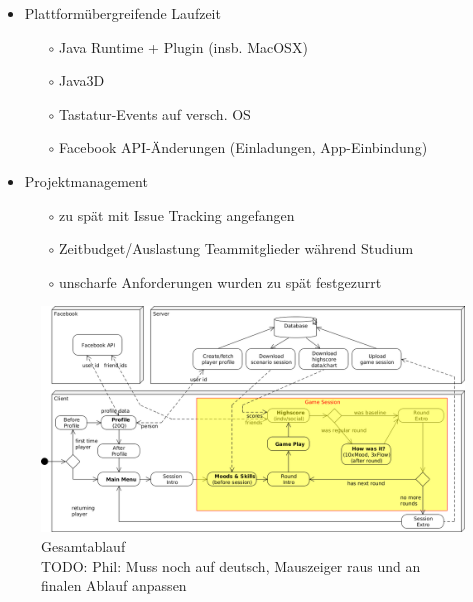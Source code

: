 \documentclass[a4paper,12pt]{scrartcl}
\begin{document}
\begin{itemize}
  \item Plattformübergreifende Laufzeit
  	\begin{itemize}
    	\item[$\circ$] Java Runtime + Plugin (insb. MacOSX)
    	\item[$\circ$] Java3D
		\item[$\circ$] Tastatur-Events auf versch. OS
		\item[$\circ$] Facebook API-Änderungen (Einladungen, App-Einbindung)
  	\end{itemize}
\item Projektmanagement
	\begin{itemize}
  		\item[$\circ$] zu spät mit Issue Tracking angefangen
  		\item[$\circ$] Zeitbudget/Auslastung Teammitglieder während Studium
  		\item[$\circ$] unscharfe Anforderungen wurden zu spät festgezurrt
	\end{itemize}
\end{itemize}

\begin{figure}[htp]
\begin{center}
  \includegraphics[width=\textwidth]{Gesamtablauf.png}
  \caption[Gesamtablauf]{Gesamtablauf\\
TODO: Phil: Muss noch auf deutsch, Mauszeiger raus und an finalen Ablauf anpassen}
  \label{fig:Gesamtablauf}
\end{center}
\end{figure} 


\clearpage

\clearpage
{}
\listoffigures
  
\clearpage
{}
{}

\end{document}
